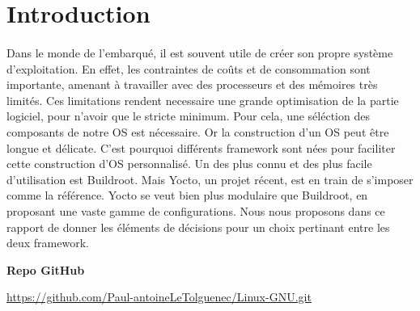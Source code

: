 \section{Introduction}
\paragraph{}
Dans le monde de l'embarqué, il est souvent utile de créer son propre système d'exploitation. En effet, les contraintes de coûts et de consommation sont importante, amenant à travailler avec des processeurs et des mémoires très limités. Ces limitations rendent necessaire une grande optimisation de la partie logiciel, pour n'avoir que le stricte minimum. Pour cela, une séléction des composants de notre OS est nécessaire.
Or la construction d'un OS peut être longue et délicate. C'est pourquoi différents framework sont nées pour faciliter cette construction d'OS personnalisé. Un des plus connu et des plus facile d'utilisation est Buildroot. Mais Yocto, un projet récent, est en train de s'imposer comme la référence. Yocto se veut bien plus modulaire que Buildroot, en proposant une vaste gamme de configurations. Nous nous proposons dans ce rapport de donner les éléments de décisions pour un choix pertinant entre les deux framework.


\textbf{Repo GitHub}

\url{https://github.com/Paul-antoineLeTolguenec/Linux-GNU.git}

\newpage
